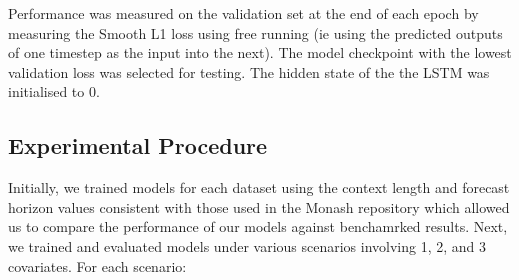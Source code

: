 \documentclass{article}
\begin{document}
Performance was measured on the validation set at the end of each epoch by measuring the Smooth L1 loss using
free running (ie using the predicted outputs of one timestep as the input into the next). The model checkpoint
with the lowest validation loss was selected for testing. The hidden state of the the LSTM was initialised to $0$. 





\subsection{Experimental Procedure}
Initially, we trained models for each dataset using the context length and forecast horizon values consistent with 
those used in the Monash repository which allowed us to compare the performance of our models 
against benchamrked results. Next, we trained and evaluated models under various scenarios involving 1, 2, and 3 
covariates. For each scenario:
\end{document}
